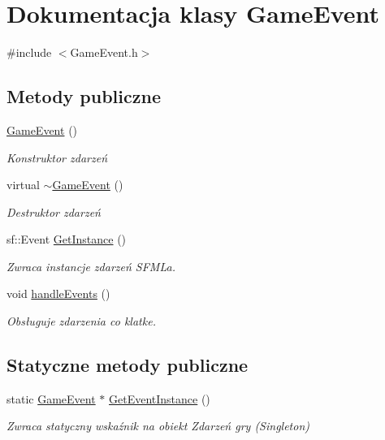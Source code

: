 \hypertarget{class_game_event}{}\section{Dokumentacja klasy Game\+Event}
\label{class_game_event}


{\ttfamily \#include $<$Game\+Event.\+h$>$}

\subsection*{Metody publiczne}
\begin{DoxyCompactItemize}
\item 
\mbox{\hyperlink{class_game_event_a0a8133b65ffc98712879d18186ef3020}{Game\+Event}} ()
\begin{DoxyCompactList}\small\item\em Konstruktor zdarzeń \end{DoxyCompactList}\item 
virtual \mbox{\hyperlink{class_game_event_aaf514ed35c80bbbcc54ce411d9d71eef}{$\sim$\+Game\+Event}} ()
\begin{DoxyCompactList}\small\item\em Destruktor zdarzeń \end{DoxyCompactList}\item 
sf\+::\+Event \mbox{\hyperlink{class_game_event_adbf21138a4eb40624a0f40b2ff75f6db}{Get\+Instance}} ()
\begin{DoxyCompactList}\small\item\em Zwraca instancje zdarzeń S\+F\+ML\textquotesingle{}a. \end{DoxyCompactList}\item 
void \mbox{\hyperlink{class_game_event_a73a56d31069079123f03f20855cb9bf0}{handle\+Events}} ()
\begin{DoxyCompactList}\small\item\em Obsługuje zdarzenia co klatke. \end{DoxyCompactList}\end{DoxyCompactItemize}
\subsection*{Statyczne metody publiczne}
\begin{DoxyCompactItemize}
\item 
static \mbox{\hyperlink{class_game_event}{Game\+Event}} $\ast$ \mbox{\hyperlink{class_game_event_a683bf5025fe1a31263cb96059fc9e5a5}{Get\+Event\+Instance}} ()
\begin{DoxyCompactList}\small\item\em Zwraca statyczny wskaźnik na obiekt Zdarzeń gry (Singleton) \end{DoxyCompactList}\end{DoxyCompactItemize}


